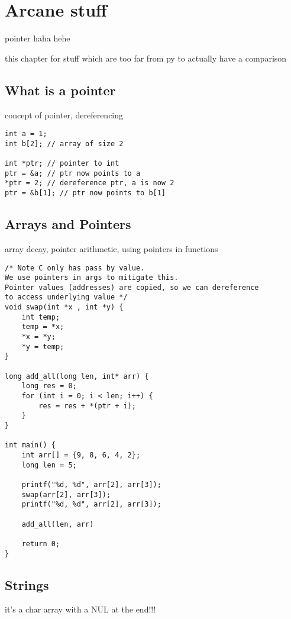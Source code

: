\chapter{Arcane stuff}

pointer haha hehe

this chapter for stuff which are too far from py to actually have a comparison

\section{What is a pointer}
concept of pointer, dereferencing
\begin{verbatim}
int a = 1;
int b[2]; // array of size 2

int *ptr; // pointer to int
ptr = &a; // ptr now points to a
*ptr = 2; // dereference ptr, a is now 2
ptr = &b[1]; // ptr now points to b[1]
\end{verbatim}

\section{Arrays and Pointers}
array decay, pointer arithmetic, using pointers in functions

\begin{verbatim}
/* Note C only has pass by value. 
We use pointers in args to mitigate this. 
Pointer values (addresses) are copied, so we can dereference 
to access underlying value */
void swap(int *x , int *y) {
    int temp;
    temp = *x;
    *x = *y;
    *y = temp;
}

long add_all(long len, int* arr) {
    long res = 0;
    for (int i = 0; i < len; i++) {
        res = res + *(ptr + i);
    }
}

int main() {
    int arr[] = {9, 8, 6, 4, 2};
    long len = 5;

    printf("%d, %d", arr[2], arr[3]);
    swap(arr[2], arr[3]);
    printf("%d, %d", arr[2], arr[3]);

    add_all(len, arr)

    return 0;
}
\end{verbatim}

\section{Strings}
it's a char array with a NUL at the end!!!


